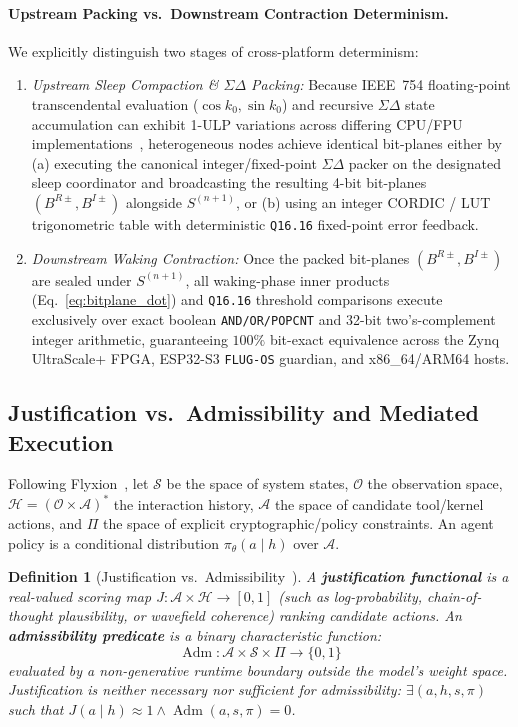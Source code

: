 \documentclass[10pt, twocolumn, a4paper]{article}
\newtheorem{definition}{Definition}
\begin{document}
\paragraph{Upstream Packing vs.\ Downstream Contraction Determinism.}
We explicitly distinguish two stages of cross-platform determinism:
\begin{enumerate}
    \item \emph{Upstream Sleep Compaction \& $\Sigma\Delta$ Packing:} Because IEEE~754 floating-point transcendental evaluation ($\cos k_0, \sin k_0$) and recursive $\Sigma\Delta$ state accumulation can exhibit 1-ULP variations across differing CPU/FPU implementations~\cite{goldberg1991floating}, heterogeneous nodes achieve identical bit-planes either by (a) executing the canonical integer/fixed-point $\Sigma\Delta$ packer on the designated sleep coordinator and broadcasting the resulting 4-bit bit-planes $(B^{R\pm}, B^{I\pm})$ alongside $S^{(n+1)}$, or (b) using an integer CORDIC / LUT trigonometric table with deterministic \texttt{Q16.16} fixed-point error feedback.
    \item \emph{Downstream Waking Contraction:} Once the packed bit-planes $(B^{R\pm}, B^{I\pm})$ are sealed under $S^{(n+1)}$, all waking-phase inner products (Eq.~\ref{eq:bitplane_dot}) and \texttt{Q16.16} threshold comparisons execute exclusively over exact boolean \texttt{AND/OR/POPCNT} and 32-bit two's-complement integer arithmetic, guaranteeing $100\%$ bit-exact equivalence across the Zynq UltraScale+ FPGA, ESP32-S3 \texttt{FLUG-OS} guardian, and x86\_64/ARM64 hosts.
\end{enumerate}

\subsection{Justification vs.\ Admissibility and Mediated Execution}
Following Flyxion~\cite{flyxion2026permissions}, let $\mathcal{S}$ be the space of system states, $\mathcal{O}$ the observation space, $\mathcal{H} = (\mathcal{O} \times \mathcal{A})^*$ the interaction history, $\mathcal{A}$ the space of candidate tool/kernel actions, and $\Pi$ the space of explicit cryptographic/policy constraints. An agent policy is a conditional distribution $\pi_\theta(a \mid h)$ over $\mathcal{A}$.

\begin{definition}[Justification vs.\ Admissibility~\cite{flyxion2026permissions}]
\label{def:adm}
A \textbf{justification functional} is a real-valued scoring map $J : \mathcal{A} \times \mathcal{H} \to [0,1]$ (such as log-probability, chain-of-thought plausibility, or wavefield coherence) ranking candidate actions. An \textbf{admissibility predicate} is a binary characteristic function:
\begin{equation}
\operatorname{Adm} : \mathcal{A} \times \mathcal{S} \times \Pi \to \{0,1\}
\label{eq:adm_def}
\end{equation}
evaluated by a non-generative runtime boundary outside the model's weight space. Justification is neither necessary nor sufficient for admissibility: $\exists (a, h, s, \pi)$ such that $J(a \mid h) \approx 1 \wedge \operatorname{Adm}(a, s, \pi) = 0$.
\end{definition}
\end{document}
